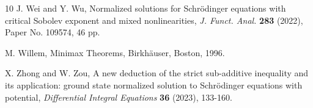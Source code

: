 \documentclass[10pt]{article}
\numberwithin{equation}{section}
\numberwithin{equation}{section}
\begin{document}
\begin{thebibliography}{10}
 J. Wei and Y. Wu,
Normalized solutions for Schrödinger equations with critical Sobolev exponent and mixed nonlinearities, {\it J. Funct. Anal.} {\bf283} (2022), Paper No. 109574, 46 pp.



 M. Willem, Minimax Theorems, Birkh\"{a}user, Boston, 1996.


 X. Zhong and W. Zou, A new deduction of the strict sub-additive inequality and its application: ground state normalized solution to Schr\"{o}dinger equations with potential, {\it Differential Integral Equations} {\bf 36} (2023), 133-160.
\endgroup
\end{thebibliography}
\end{document}

